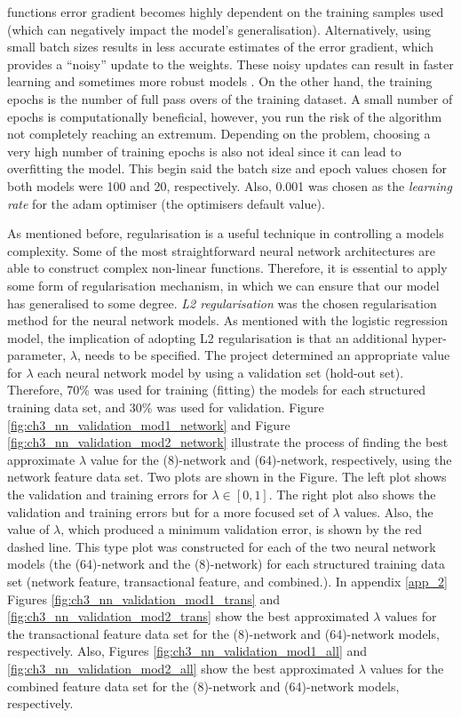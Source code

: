 functions error gradient becomes highly dependent on the training samples used (which can negatively impact the model's generalisation). Alternatively, using small batch sizes results in less accurate estimates of the error gradient, which provides a ``noisy'' update to the weights. These noisy updates can result in faster learning and sometimes more robust models \citep*{jason2019batch}. On the other hand, the training epochs is the number of full pass overs of the training dataset. A small number of epochs is computationally beneficial, however, you run the risk of the algorithm not completely reaching an extremum. Depending on the problem, choosing a very high number of training epochs is also not ideal since it can lead to overfitting the model. This begin said the batch size and epoch values chosen for both models were 100 and 20, respectively. Also, 0.001 was chosen as the \textit{learning rate} for the adam optimiser (the optimisers default value).

As mentioned before, regularisation is a useful technique in controlling a models complexity. Some of the most straightforward neural network architectures are able to construct complex non-linear functions. Therefore, it is essential to apply some form of regularisation mechanism, in which we can ensure that our model has generalised to some degree. \textit{L2 regularisation} was the chosen regularisation method for the neural network models. As mentioned with the logistic regression model, the implication of adopting L2 regularisation is that an additional hyper-parameter, $\lambda$, needs to be specified. The project determined an appropriate value for $\lambda$ each neural network model by using a validation set (hold-out set). Therefore, 70\% was used for training (fitting) the models for each structured training data set, and 30\% was used for validation. Figure \ref{fig:ch3_nn_validation_mod1_network} and Figure \ref{fig:ch3_nn_validation_mod2_network}  illustrate the process of finding the best approximate $\lambda$ value for the (8)-network and (64)-network, respectively, using the network feature data set. Two plots are shown in the Figure. The left plot shows the validation and training errors for $\lambda \in [0,1]$. The right plot also shows the validation and training errors but for a more focused set of $\lambda$ values. Also, the value of $\lambda$, which produced a minimum validation error, is shown by the red dashed line. This type plot was constructed for each of the two neural network models (the (64)-network and the (8)-network) for each structured training data set (network feature, transactional feature, and combined.). In appendix \ref{app_2} Figures \ref{fig:ch3_nn_validation_mod1_trans} and \ref{fig:ch3_nn_validation_mod2_trans} show the best approximated $\lambda$ values for the transactional feature data set for the (8)-network and (64)-network models, respectively. Also, Figures \ref{fig:ch3_nn_validation_mod1_all} and \ref{fig:ch3_nn_validation_mod2_all} show the best approximated $\lambda$ values for the combined feature data set for the (8)-network and (64)-network models, respectively.

